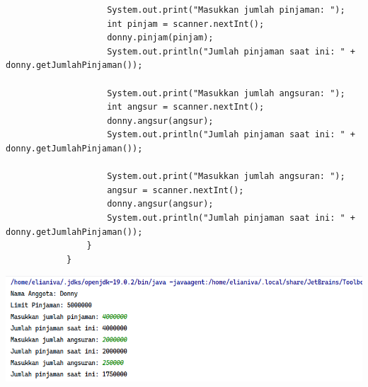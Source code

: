 \documentclass[12pt,titlepage]{article}
\begin{document}
\begin{enumerate}
{\begin{verbatim}
                    System.out.print("Masukkan jumlah pinjaman: ");
                    int pinjam = scanner.nextInt();
                    donny.pinjam(pinjam);
                    System.out.println("Jumlah pinjaman saat ini: " + donny.getJumlahPinjaman());

                    System.out.print("Masukkan jumlah angsuran: ");
                    int angsur = scanner.nextInt();
                    donny.angsur(angsur);
                    System.out.println("Jumlah pinjaman saat ini: " + donny.getJumlahPinjaman());

                    System.out.print("Masukkan jumlah angsuran: ");
                    angsur = scanner.nextInt();
                    donny.angsur(angsur);
                    System.out.println("Jumlah pinjaman saat ini: " + donny.getJumlahPinjaman());
                }
            }
        \end{verbatim}

        \begin{center}
            \includegraphics[width=.8\textwidth]{./images/task-2.png}
        \end{center}
    }
\end{enumerate}
\end{document}

